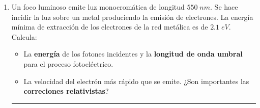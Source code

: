 \documentclass[a4paper,12pt]{exam}
\newcommand{\halmos}{\vspace*{-7mm}
	
					\begin{flushright}
						\rule{1mm}{2.5mm} 
					\end{flushright}\vspace*{-6mm}
						
					  }
\renewcommand{\qed}{\halmos}
\begin{document}
\begin{enumerate}
	
%	
%		
%			
	
	
	\item Un foco luminoso emite luz monocromática de longitud $550\;nm$. Se hace incidir 				la luz sobre un metal produciendo la emisión de electrones. La energía mínima de extracción de los 						electrones de la red metálica es de $2.1\;eV$. Calcula:
			\begin{itemize}
				\item[a)] La \textbf{energía} de los fotones incidentes y la\textbf{ longitud de onda umbral} para el proceso fotoeléctrico.
				\item[b)] La velocidad del electrón más rápido que se emite. ¿Son importantes las \textbf{correciones relativistas}?
			\end{itemize}		 
		\qed	
		
\end{enumerate}		
 
\end{document}
